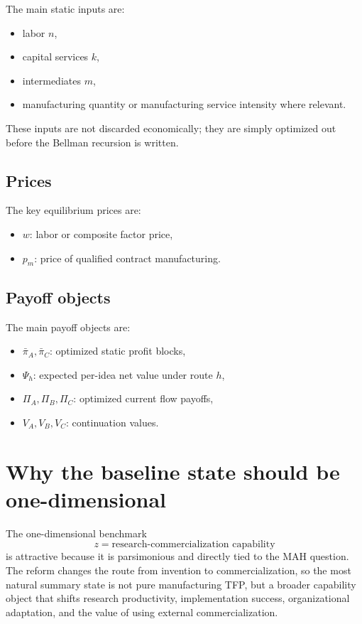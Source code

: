 \documentclass[12pt]{article}
\begin{document}
The main static inputs are:
\begin{itemize}[leftmargin=2em]
    \item labor $n$,
    \item capital services $k$,
    \item intermediates $m$,
    \item manufacturing quantity or manufacturing service intensity where relevant.
\end{itemize}
These inputs are not discarded economically; they are simply optimized out before the
Bellman recursion is written.

\subsection{Prices}

The key equilibrium prices are:
\begin{itemize}[leftmargin=2em]
    \item $w$: labor or composite factor price,
    \item $p_m$: price of qualified contract manufacturing.
\end{itemize}

\subsection{Payoff objects}

The main payoff objects are:
\begin{itemize}[leftmargin=2em]
    \item $\bar{\pi}_A,\bar{\pi}_C$: optimized static profit blocks,
    \item $\Psi_h$: expected per-idea net value under route $h$,
    \item $\Pi_A,\Pi_B,\Pi_C$: optimized current flow payoffs,
    \item $V_A,V_B,V_C$: continuation values.
\end{itemize}

\section{Why the baseline state should be one-dimensional}

The one-dimensional benchmark
\[
z=\text{research-commercialization capability}
\]
is attractive because it is parsimonious and directly tied to the MAH question.
The reform changes the route from invention to commercialization, so the most natural
summary state is not pure manufacturing TFP, but a broader capability object that
shifts research productivity, implementation success, organizational adaptation, and
the value of using external commercialization.
\end{document}
